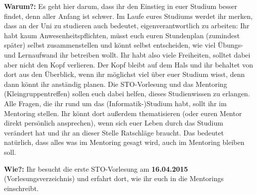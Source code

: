 \textbf{Warum?:} Es geht hier darum, dass ihr den Einstieg in euer Studium besser findet, denn aller Anfang ist schwer. Im Laufe eures Studiums werdet ihr merken, dass an der Uni zu studieren auch bedeutet, eigenverantwortlich zu arbeiten: Ihr habt kaum Anwesenheitspflichten, müsst euch euren Stundenplan (zumindest später) selbst zusammenstellen und könnt selbst entscheiden, wie viel Übungs- und Lernaufwand ihr betreiben wollt. 
Ihr habt also viele Freiheiten, solltet dabei aber nicht den Kopf verlieren. Der Kopf bleibt auf dem Hals und ihr behaltet von dort aus den Überblick, wenn ihr möglichst viel über euer Studium wisst, denn dann könnt ihr anständig planen.
Die STO-Vorlesung und das Mentoring (Kleingruppentreffen) sollen euch dabei helfen, dieses Studienwissen zu erlangen. Alle Fragen, die ihr rund um das (Informatik-)Studium habt, sollt ihr im Mentoring stellen. Ihr könnt dort außerdem thematisieren (oder euren Mentor direkt persönlich ansprechen), wenn sich euer Leben durch das Studium verändert hat und ihr an dieser Stelle Ratschläge braucht. Das bedeutet natürlich, dass alles was im Mentoring gesagt wird, auch im Mentoring bleiben soll.

\textbf{Wie?:} Ihr besucht die erste STO-Vorlesung am \textbf{16.04.2015} (Vorlesungsverzeichnis) und erfahrt dort, wie ihr euch in die Mentorings einschreibt.
\spaltenende

